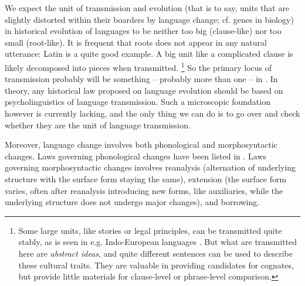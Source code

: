 \documentclass[a4paper, oneside, scheme=plain, 12pt]{article}
\newcommand*{\citechap}[1]{Ch.~{#1}}
\begin{document}
We expect the unit of transmission and evolution
(that is to say, units that are slightly distorted within their boarders by language change;
cf. genes in biology)
in historical evolution of languages
to be neither too big (clause-like) nor too small (root-like).
It is frequent that roots does not appear in any natural utterance:
Latin is a quite good example.
A big unit like a complicated clause is likely decomposed into pieces when transmitted.%
\footnote{
    Some large units, like stories or legal principles, can be transmitted quite stably,
    as is seen in e.g. Indo-European languages \citep[\citechap{2}]{fortson2011indo}.
    But what are transmitted here are \emph{abstract ideas},
    and quite different sentences can be used to describe these cultural traits.
    They are valuable in providing candidates for cognates,
    but provide little materials for clause-level or phrase-level comparison.
}
So the primary locus of transmission probably will be something -- probably more than one -- in .
In theory, any historical law proposed on language evolution 
should be based on psycholinguistics of language transmission.
Such a microscopic foundation however is currently lacking,
and the only thing we can do is to go over 
and check whether they are the unit of language transmission.

Moreover, language change involves both phonological and morphosyntactic changes.
Laws governing phonological changes have been listed in .
Laws governing morphosyntactic changes involves reanalysis (alternation of underlying structure with the surface form staying the same), extension (the surface form varies, often after reanalysis introducing new forms, like auxiliaries, while the underlying structure does not undergo major changes), and borrowing.
\end{document}
